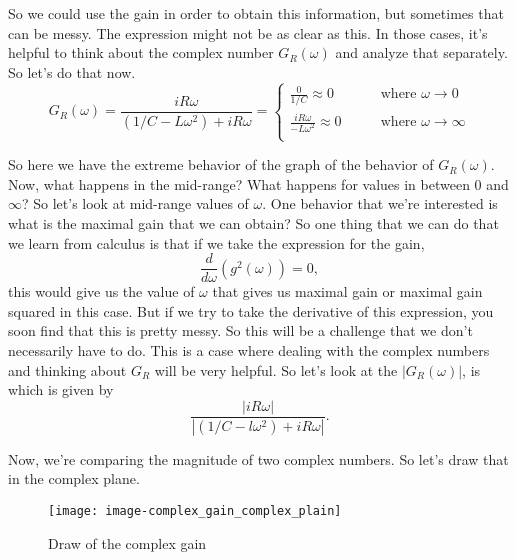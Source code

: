 So we could use the gain in order
to obtain this information, but sometimes that can be messy.
The expression might not be as clear as this.
In those cases, it's helpful to think about the complex number
$G _R (\omega)$ and analyze that separately.
So let's do that now.
\begin{equation*}
  G _R (\omega) = \frac{iR \omega}{(1/C - L \omega ^2) + iR\omega} =
  \begin{cases}
    \frac{0}{1/C} \approx 0 & \qquad \text{where } \omega \to 0 \\
    \frac{iR \omega}{-L \omega^2} \approx 0 & \qquad \text{where } \omega \to \infty \\
  \end{cases}
\end{equation*}

So here we have the extreme behavior of the graph of the behavior of $G_ R(\omega)$.\\

Now, what happens in the mid-range?
What happens for values in between $0$ and $\infty$?
So let's look at mid-range values of $\omega$.
One behavior that we're interested is what is the maximal gain that we can obtain?
So one thing that we can do that we learn from calculus
is that if we take the expression for the gain,
\begin{equation*}
  \frac{d}{d \omega} \left( g ^2 (\omega) \right) = 0,   
\end{equation*}
this would give us the value of $\omega$ that
gives us maximal gain or maximal gain squared in this case.
But if we try to take the derivative of this expression,
you soon find that this is pretty messy.
So this will be a challenge that we don't necessarily
have to do.
This is a case where dealing with the complex numbers
and thinking about $G _R$ will be very helpful.
So let's look at the $|G _R (\omega)|$,  is 
which is given by
\begin{equation*}
  \frac{| i R \omega|}{| (1/C -l \omega ^2) + i R \omega |}. 
\end{equation*}

Now, we're comparing the magnitude
of two complex numbers.
So let's draw that in the complex plane.

\begin{figure}[ht!]
  \centering
  \texttt{[image: image-complex\_gain\_complex\_plain]}
  \caption{Draw of the complex gain}
\end{figure}


